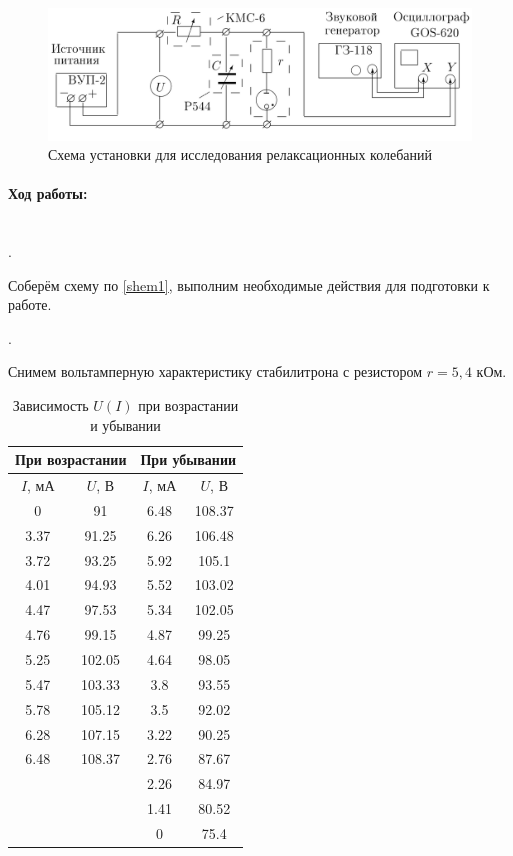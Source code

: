 \documentclass[a4paper, 12pt]{article}
\newcommand{\parag}[1]{\paragraph*{#1:}}
\newcounter{Points}
\newcommand{\point}{\arabic{Points}. \addtocounter{Points}{1}}
\begin{document}
\begin{figure}[!h]
    \includegraphics[scale = 0.2]{Workplace2}
    \centering
    \caption{Схема установки для исследования релаксационных колебаний}
\end{figure}

\parag {Ход работы} ~\\

\point Соберём схему по \ref{shem1}, выполним необходимые действия для подготовки к работе.

\point Снимем вольтамперную характеристику стабилитрона с резистором $r = 5,4$ кОм.

\begin{table}[!h]
    \centering
    \begin{tabular}{|c|c||c|c|}
        \hline
        \multicolumn{2}{|c||}{При возрастании} & \multicolumn{2}{c|}{При убывании} \\ \hline
        $I$, мА & $U$, В & $I$, мА & $U$, В  \\ \hline
        0 & 91 & 6.48 & 108.37 \\ \hline
        3.37 & 91.25 & 6.26 & 106.48 \\ \hline
        3.72 & 93.25 & 5.92 & 105.1 \\ \hline
        4.01 & 94.93 & 5.52 & 103.02 \\ \hline
        4.47 & 97.53 & 5.34 & 102.05 \\ \hline
        4.76 & 99.15 & 4.87 & 99.25 \\ \hline
        5.25 & 102.05 & 4.64 & 98.05 \\ \hline
        5.47 & 103.33 & 3.8 & 93.55 \\ \hline
        5.78 & 105.12 & 3.5 & 92.02 \\ \hline
        6.28 & 107.15 & 3.22 & 90.25 \\ \hline
        6.48 & 108.37 & 2.76 & 87.67 \\ \hline
            &        & 2.26 & 84.97 \\ \hline
            &        & 1.41 & 80.52 \\ \hline
            &        & 0 & 75.4 \\ \hline
    \end{tabular}
    \caption {Зависимость $U (I)$ при возрастании и убывании}
    \label{V-A}
\end{table}
\end{document}
